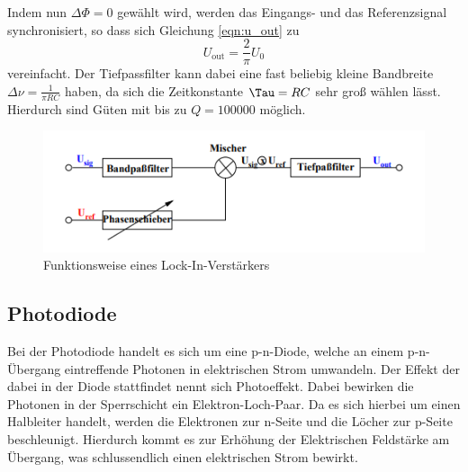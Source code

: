     Indem nun $\Delta \Phi = 0$ gewählt wird, werden das Eingangs- und das Referenzsignal synchronisiert, so dass sich Gleichung \ref{eqn:u_out}
    zu
    \begin{equation}
        U_\text{out} = \frac{2}{\pi} U_0
    \end{equation}
    vereinfacht. Der Tiefpassfilter kann dabei eine fast beliebig kleine Bandbreite $\Delta \nu  = \frac{1}{\pi R C}$ haben, da sich die Zeitkonstante $\Tau = R C$ sehr groß wählen lässt.
    Hierdurch sind Güten mit bis zu $Q = 100000$ möglich.
    \begin{figure}[!h]
        \centering
        \includegraphics{content/abbildung1.png}
        \caption{Funktionsweise eines Lock-In-Verstärkers \cite[1]{V303}}
        \label{fig:funktion}
        \end{figure}
        \newpage
\subsection{Photodiode}
    Bei der Photodiode handelt es sich um eine p-n-Diode, welche an einem p-n-Übergang eintreffende Photonen in elektrischen Strom umwandeln. 
    Der Effekt der dabei in der Diode stattfindet nennt sich Photoeffekt. Dabei bewirken die Photonen 
    in der Sperrschicht ein Elektron-Loch-Paar. Da es sich hierbei um einen Halbleiter handelt, werden die Elektronen zur n-Seite und die Löcher zur p-Seite beschleunigt.
    Hierdurch kommt es zur Erhöhung der Elektrischen Feldstärke am Übergang, was schlussendlich einen elektrischen Strom bewirkt. \cite{diode}